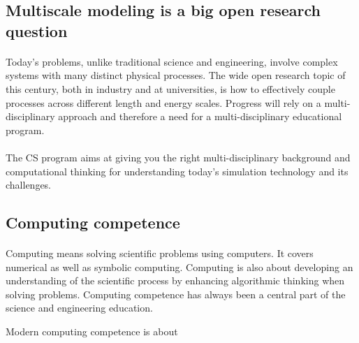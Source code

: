 \documentclass[%
oneside,                 %
final,                   %
10pt]{article}
\begin{document}
\subsection{Multiscale modeling is a big open research question}



\paragraph{}
Today's problems, unlike traditional
science and engineering, involve complex systems with many distinct
physical processes. The wide open research topic of this century, both
in industry and at universities, is how to effectively couple
processes across different length and energy scales. Progress will
rely on a multi-disciplinary approach and therefore a need for
a multi-disciplinary educational program.




\paragraph{}
The CS program aims at giving you  the right
multi-disciplinary background and computational thinking for
understanding today's simulation technology and its challenges.







\subsection{Computing competence}

\paragraph{}
Computing means solving scientific problems using computers. It covers
numerical as well as symbolic computing. Computing is also about
developing an understanding of the scientific process by enhancing
algorithmic thinking when solving problems.  Computing competence has
always been a central part of the science and engineering
education.

Modern computing competence is about
\end{document}
